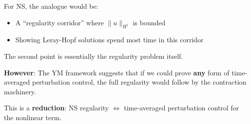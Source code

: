 \documentclass[11pt]{article}
\theoremstyle{definition}
\begin{document}
For NS, the analogue would be:
\begin{itemize}
\item A ``regularity corridor'' where $\|u\|_{H^1}$ is bounded
\item Showing Leray-Hopf solutions spend most time in this corridor
\end{itemize}

The second point is essentially the regularity problem itself.

\textbf{However}: The YM framework suggests that if we could prove \textbf{any} form of 
time-averaged perturbation control, the full regularity would follow by the contraction 
machinery.

This is a \textbf{reduction}: NS regularity $\Leftrightarrow$ time-averaged perturbation 
control for the nonlinear term.
\end{document}
